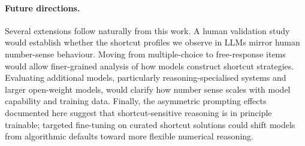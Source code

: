 \paragraph{Future directions.}
Several extensions follow naturally from this work.
A human validation study would establish whether the shortcut profiles we observe in LLMs mirror human number-sense behaviour.
Moving from multiple-choice to free-response items would allow finer-grained analysis of how models construct shortcut strategies.
Evaluating additional models, particularly reasoning-specialised systems and larger open-weight models, would clarify how number sense scales with model capability and training data.
Finally, the asymmetric prompting effects documented here suggest that shortcut-sensitive reasoning is in principle trainable; targeted fine-tuning on curated shortcut solutions could shift models from algorithmic defaults toward more flexible numerical reasoning.
